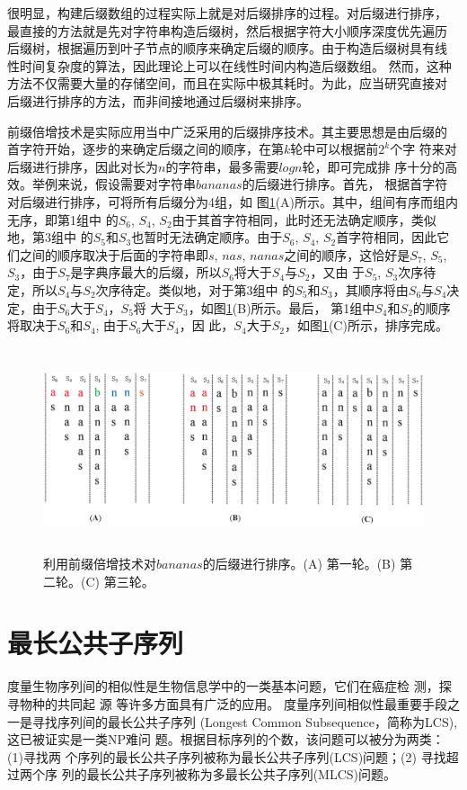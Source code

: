 很明显，构建后缀数组的过程实际上就是对后缀排序的过程。对后缀进行排序，
最直接的方法就是先对字符串构造后缀树，然后根据字符大小顺序深度优先遍历
后缀树，根据遍历到叶子节点的顺序来确定后缀的顺序。由于构造后缀树具有线
性时间复杂度的算法，因此理论上可以在线性时间内构造后缀数组。 然而，这种
方法不仅需要大量的存储空间，而且在实际中极其耗时。为此，应当研究直接对
后缀进行排序的方法，而非间接地通过后缀树来排序。

前缀倍增技术是实际应用当中广泛采用的后缀排序技术。其主要思想是由后缀的
首字符开始，逐步的来确定后缀之间的顺序，在第$k$轮中可以根据前$2^k$个字
符来对后缀进行排序，因此对长为$n$的字符串，最多需要$logn$轮，即可完成排
序十分的高效。举例来说，假设需要对字符串$bananas$的后缀进行排序。首先，
根据首字符对后缀进行排序，可将所有后缀分为4组，如
图\ref{fig:Prefix_Doubling}(A)所示。其中，组间有序而组内无序，即第1组中
的$S_6$, $S_4$,
$S_2$由于其首字符相同，此时还无法确定顺序，类似地，第3组中
的$S_5$和$S_3$也暂时无法确定顺序。由于$S_6$, $S_4$,
$S_2$首字符相同，因此它们之间的顺序取决于后面的字符串即$s$, $nas$,
$nanas$之间的顺序，这恰好是$S_7$, $S_5$,
$S_3$，由于$S_7$是字典序最大的后缀，所以$S_6$将大于$S_4$与$S_2$，又由
于$S_5$,
$S_3$次序待定，所以$S_4$与$S_2$次序待定。类似地，对于第3组中
的$S_5$和$S_3$，其顺序将由$S_6$与$S_4$决定，由于$S_6$大于$S_4$，$S_5$将
大于$S_3$，如图\ref{fig:Prefix_Doubling}(B)所示。最后，
第1组中$S_4$和$S_2$的顺序将取决于$S_6$和$S_4$, 由于$S_6$大于$S_4$，因
此，$S_4 $大于$S_2$，如图\ref{fig:Prefix_Doubling}(C)所示，排序完成。

\begin{figure}[!h]
  \centering
  \includegraphics[height=6cm ,width=15cm]{figures/1_Introduction/Prefix_Doubling.eps}
  \caption{利用前缀倍增技术对$bananas$的后缀进行排序。(A) 第一轮。(B) 第二轮。(C) 第三轮。}
  \label{fig:Prefix_Doubling}
\end{figure}


\section{最长公共子序列}

度量生物序列间的相似性是生物信息学中的一类基本问题，它们在癌症检
测\cite{Aravanis2017,Chattopadhyay2016,Munday2017}，探寻物种的共同起
源 \cite{Zvelebil2007,Perry2015,Donnell2015} 等许多方面具有广泛的应用。
度量序列间相似性最重要手段之一是寻找序列间的最长公共子序列 (Longest
Common Subsequence，简称为LCS), 这已被证实是一类NP难问
题\cite{Maier1978}。根据目标序列的个数，该问题可以被分为两类：(1)寻找两
个序列的最长公共子序列被称为最长公共子序列(LCS)问题；(2) 寻找超过两个序
列的最长公共子序列被称为多最长公共子序列(MLCS)问题。
